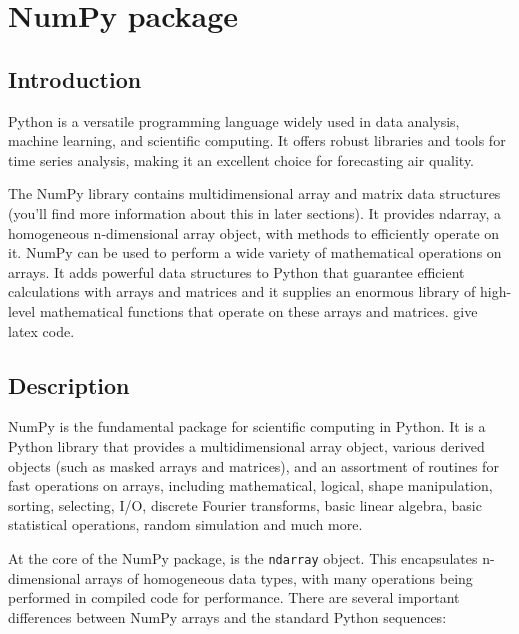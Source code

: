 %
%
%
\chapter{NumPy package}
\section{Introduction}

Python is a versatile programming language widely used in data analysis, machine
learning, and scientific computing. It offers robust libraries and tools for time
series analysis, making it an excellent choice for forecasting air quality.

\bigskip

The NumPy library contains multidimensional array and matrix data structures (you’ll
find more information about this in later sections). It provides ndarray, a homogeneous
n-dimensional array object, with methods to efficiently operate on it. NumPy can
be used to perform a wide variety of mathematical operations on arrays. It adds
powerful data structures to Python that guarantee efficient calculations with
arrays and matrices and it supplies an enormous library of high-level
mathematical functions that operate on these arrays and matrices. give latex code.

\section{Description}

NumPy is the fundamental package for scientific computing in Python. It is a Python
library that provides a multidimensional array object, various derived objects (such
as masked arrays and matrices), and an assortment of routines for fast operations
on arrays, including mathematical, logical, shape manipulation, sorting,
selecting, I/O, discrete Fourier transforms, basic linear algebra, basic
statistical operations, random simulation and much more.\cite{NumPy:2024}

At the core of the NumPy package, is the \texttt{ndarray} object. This encapsulates
n-dimensional arrays of homogeneous data types, with many operations being
performed in compiled code for performance. There are several important differences
between NumPy arrays and the standard Python sequences:


